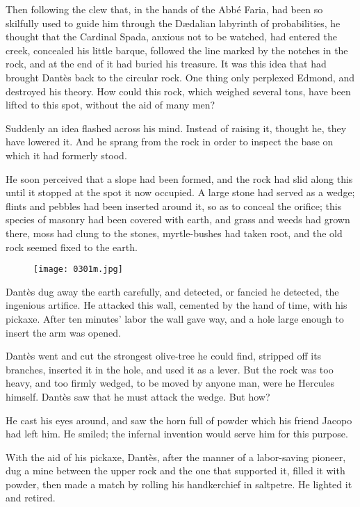 Then following the clew that, in the hands of the Abbé Faria, had been
so skilfully used to guide him through the Dædalian labyrinth of
probabilities, he thought that the Cardinal Spada, anxious not to be
watched, had entered the creek, concealed his little barque, followed
the line marked by the notches in the rock, and at the end of it had
buried his treasure. It was this idea that had brought Dantès back to
the circular rock. One thing only perplexed Edmond, and destroyed his
theory. How could this rock, which weighed several tons, have been
lifted to this spot, without the aid of many men?

Suddenly an idea flashed across his mind. Instead of raising it,
thought he, they have lowered it. And he sprang from the rock in order
to inspect the base on which it had formerly stood.

He soon perceived that a slope had been formed, and the rock had slid
along this until it stopped at the spot it now occupied. A large stone
had served as a wedge; flints and pebbles had been inserted around it,
so as to conceal the orifice; this species of masonry had been covered
with earth, and grass and weeds had grown there, moss had clung to the
stones, myrtle-bushes had taken root, and the old rock seemed fixed to
the earth.

\begin{figure}[ht]
\texttt{[image: 0301m.jpg]}
\end{figure}

Dantès dug away the earth carefully, and detected, or fancied he
detected, the ingenious artifice. He attacked this wall, cemented by
the hand of time, with his pickaxe. After ten minutes’ labor the wall
gave way, and a hole large enough to insert the arm was opened.

Dantès went and cut the strongest olive-tree he could find, stripped
off its branches, inserted it in the hole, and used it as a lever. But
the rock was too heavy, and too firmly wedged, to be moved by anyone
man, were he Hercules himself. Dantès saw that he must attack the
wedge. But how?

He cast his eyes around, and saw the horn full of powder which his
friend Jacopo had left him. He smiled; the infernal invention would
serve him for this purpose.

With the aid of his pickaxe, Dantès, after the manner of a labor-saving
pioneer, dug a mine between the upper rock and the one that supported
it, filled it with powder, then made a match by rolling his
handkerchief in saltpetre. He lighted it and retired.

